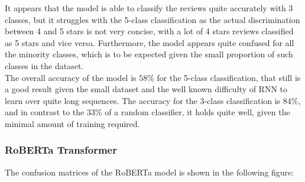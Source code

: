             It appears that the model is able to classify the reviews quite accurately with
            3 classes, but it struggles with the 5-class classification as the actual discrimination between 4 and 
            5 stars is not very concise, with a lot of 4 stars reviews classified as 5 stars
            and vice versa. Furthermore, the model appears quite confused for all the minority classes,
            which is to be expected given the small proportion of such classes in the dataset. \\

            The overall accuracy of the model is $58\%$ for the 5-class classification, that still
            is a good result given the small dataset and the well known difficulty of RNN to learn
            over quite long sequences. The accuracy for the 3-class classification is $84\%$,
            and in contrast to the $33\%$ of a random classifier, it holds quite well, given the
            minimal amount of training required. \\

        \subsubsection{RoBERTa Transformer}
        \label{subsec:roberta_results}
            The confusion matrices of the RoBERTa model is shown in the following figure:

